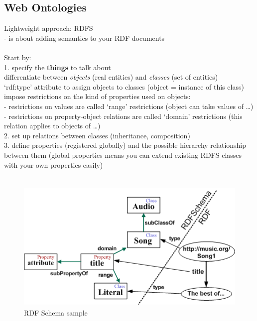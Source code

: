 \subsection{Web Ontologies}
\label{sec:semantic_ontologies}

Lightweight approach: RDFS \\
- is about adding semantics to your RDF documents \\
\\
Start by: \\
1. specify the \textbf{things} to talk about \\
   differentiate between \textit{objects} (real entities) and \textit{classes} (set of entities) \\
   `rdf:type' attribute to assign objects to classes (object = instance of this class) \\
   impose restrictions on the kind of properties used on objects: \\
   - restrictions on values are called `range' restrictions (object can take values of \ldots) \\
   - restrictions on property-object relations are called `domain' restrictions (this relation applies to objects of \ldots) \\
2. set up relations between classes (inheritance, composition) \\
3. define properties (registered globally) and the possible hierarchy relationship between them (global properties means you can
extend existing RDFS classes with your own properties easily) \\
\\
\begin{figure}[H]
	\centering
		\includegraphics[height=2.5in]{images/RDFSchema.png}
	\caption{RDF Schema sample}
\label{fig:images_rdfs_sample}
\end{figure}

